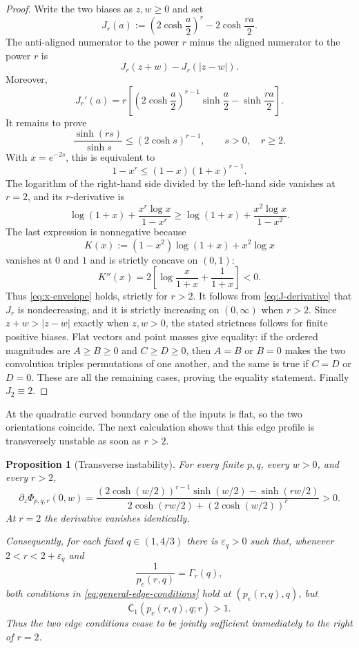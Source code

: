 \documentclass[11pt,reqno]{amsart}
\numberwithin{equation}{section}
\newtheorem{proposition}[proposition]{Proposition}
\theoremstyle{definition}
\theoremstyle{remark}
\newcommand{\Cpqr}{\mathsf C}
\begin{document}
\begin{proof}
Write the two biases as $z,w\ge0$ and set
\[
  J_r(a):=\left(2\cosh\frac a2\right)^r-2\cosh\frac{ra}{2}.
\]
The anti-aligned numerator to the power $r$ minus the aligned numerator to the
power $r$ is
\[
  J_r(z+w)-J_r(|z-w|).
\]
Moreover,
\begin{equation}\label{eq:J-derivative}
  J_r'(a)
  =r\left[
    \left(2\cosh\frac a2\right)^{r-1}\sinh\frac a2
    -\sinh\frac{ra}{2}
  \right].
\end{equation}
It remains to prove
\begin{equation}\label{eq:hyperbolic-envelope}
  \frac{\sinh(rs)}{\sinh s}\le(2\cosh s)^{r-1},
  \qquad s>0,\quad r\ge2.
\end{equation}
With $x=e^{-2s}$, this is equivalent to
\begin{equation}\label{eq:x-envelope}
  1-x^r\le(1-x)(1+x)^{r-1}.
\end{equation}
The logarithm of the right-hand side divided by the left-hand side vanishes at
$r=2$, and its $r$-derivative is
\[
  \log(1+x)+\frac{x^r\log x}{1-x^r}
  \ge
  \log(1+x)+\frac{x^2\log x}{1-x^2}.
\]
The last expression is nonnegative because
\[
  K(x):=(1-x^2)\log(1+x)+x^2\log x
\]
vanishes at $0$ and $1$ and is strictly concave on $(0,1)$:
\[
  K''(x)=2\left[\log\frac{x}{1+x}+\frac1{1+x}\right]<0.
\]
Thus \eqref{eq:x-envelope} holds, strictly for $r>2$.  It follows from
\eqref{eq:J-derivative} that $J_r$ is nondecreasing, and it is strictly
increasing on $(0,\infty)$ when $r>2$.  Since $z+w>|z-w|$ exactly when
$z,w>0$, the stated strictness follows for finite positive biases.  Flat
vectors and point masses give equality: if the ordered magnitudes are
$A\ge B\ge0$ and $C\ge D\ge0$, then $A=B$ or $B=0$ makes the two convolution
triples permutations of one another, and the same is true if $C=D$ or $D=0$.
These are all the remaining cases, proving the equality statement.  Finally
$J_2\equiv2$.
\end{proof}

At the quadratic curved boundary one of the inputs is flat, so the two
orientations coincide.  The next calculation shows that this edge profile is
transversely unstable as soon as $r>2$.

\begin{proposition}[Transverse instability]\label{prop:transverse-instability}
For every finite $p,q$, every $w>0$, and every $r>2$,
\begin{equation}\label{eq:transverse-derivative}
  \partial_z\Phi_{p,q,r}(0,w)
  =
  \frac{(2\cosh(w/2))^{r-1}\sinh(w/2)-\sinh(rw/2)}
  {2\cosh(rw/2)+(2\cosh(w/2))^r}>0.
\end{equation}
At $r=2$ the derivative vanishes identically.

Consequently, for each fixed $q\in(1,4/3)$ there is $\varepsilon_q>0$ such
that, whenever $2<r<2+\varepsilon_q$ and
\[
  \frac1{p_e(r,q)}=\Gamma_r(q),
\]
both conditions in \eqref{eq:general-edge-conditions} hold at $(p_e(r,q),q)$,
but
\[
  \Cpqr_1(p_e(r,q),q;r)>1.
\]
Thus the two edge conditions cease to be jointly sufficient immediately to the
right of $r=2$.
\end{proposition}
\end{document}
